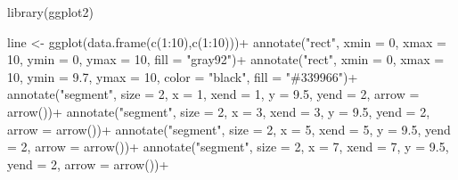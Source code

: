 \documentclass[
  letterpaper,
]{book}
\newenvironment{Shaded}{\begin{snugshade}}{\end{snugshade}}
\newcommand{\AttributeTok}[1]{\textcolor[rgb]{0.40,0.45,0.13}{#1}}
\newcommand{\DecValTok}[1]{\textcolor[rgb]{0.68,0.00,0.00}{#1}}
\newcommand{\FloatTok}[1]{\textcolor[rgb]{0.68,0.00,0.00}{#1}}
\newcommand{\FunctionTok}[1]{\textcolor[rgb]{0.28,0.35,0.67}{#1}}
\newcommand{\NormalTok}[1]{\textcolor[rgb]{0.00,0.23,0.31}{#1}}
\newcommand{\OtherTok}[1]{\textcolor[rgb]{0.00,0.23,0.31}{#1}}
\newcommand{\SpecialCharTok}[1]{\textcolor[rgb]{0.37,0.37,0.37}{#1}}
\newcommand{\StringTok}[1]{\textcolor[rgb]{0.13,0.47,0.30}{#1}}
\begin{document}
\begin{Shaded}
\begin{Highlighting}[]
\FunctionTok{library}\NormalTok{(ggplot2)}

\NormalTok{line }\OtherTok{\textless{}{-}} \FunctionTok{ggplot}\NormalTok{(}\FunctionTok{data.frame}\NormalTok{(}\FunctionTok{c}\NormalTok{(}\DecValTok{1}\SpecialCharTok{:}\DecValTok{10}\NormalTok{),}\FunctionTok{c}\NormalTok{(}\DecValTok{1}\SpecialCharTok{:}\DecValTok{10}\NormalTok{)))}\SpecialCharTok{+}
  \FunctionTok{annotate}\NormalTok{(}\StringTok{"rect"}\NormalTok{, }\AttributeTok{xmin =} \DecValTok{0}\NormalTok{, }\AttributeTok{xmax =} \DecValTok{10}\NormalTok{, }\AttributeTok{ymin =} \DecValTok{0}\NormalTok{, }\AttributeTok{ymax =} \DecValTok{10}\NormalTok{, }\AttributeTok{fill =} \StringTok{"gray92"}\NormalTok{)}\SpecialCharTok{+}
  \FunctionTok{annotate}\NormalTok{(}\StringTok{"rect"}\NormalTok{, }\AttributeTok{xmin =} \DecValTok{0}\NormalTok{, }\AttributeTok{xmax =} \DecValTok{10}\NormalTok{, }\AttributeTok{ymin =} \FloatTok{9.7}\NormalTok{, }\AttributeTok{ymax =} \DecValTok{10}\NormalTok{, }\AttributeTok{color =} \StringTok{"black"}\NormalTok{, }\AttributeTok{fill =} \StringTok{"\#339966"}\NormalTok{)}\SpecialCharTok{+}
  \FunctionTok{annotate}\NormalTok{(}\StringTok{"segment"}\NormalTok{, }\AttributeTok{size =} \DecValTok{2}\NormalTok{, }\AttributeTok{x =} \DecValTok{1}\NormalTok{, }\AttributeTok{xend =} \DecValTok{1}\NormalTok{, }\AttributeTok{y =} \FloatTok{9.5}\NormalTok{, }\AttributeTok{yend =} \DecValTok{2}\NormalTok{, }\AttributeTok{arrow =} \FunctionTok{arrow}\NormalTok{())}\SpecialCharTok{+}
  \FunctionTok{annotate}\NormalTok{(}\StringTok{"segment"}\NormalTok{, }\AttributeTok{size =} \DecValTok{2}\NormalTok{, }\AttributeTok{x =} \DecValTok{3}\NormalTok{, }\AttributeTok{xend =} \DecValTok{3}\NormalTok{, }\AttributeTok{y =} \FloatTok{9.5}\NormalTok{, }\AttributeTok{yend =} \DecValTok{2}\NormalTok{, }\AttributeTok{arrow =} \FunctionTok{arrow}\NormalTok{())}\SpecialCharTok{+}
  \FunctionTok{annotate}\NormalTok{(}\StringTok{"segment"}\NormalTok{, }\AttributeTok{size =} \DecValTok{2}\NormalTok{, }\AttributeTok{x =} \DecValTok{5}\NormalTok{, }\AttributeTok{xend =} \DecValTok{5}\NormalTok{, }\AttributeTok{y =} \FloatTok{9.5}\NormalTok{, }\AttributeTok{yend =} \DecValTok{2}\NormalTok{, }\AttributeTok{arrow =} \FunctionTok{arrow}\NormalTok{())}\SpecialCharTok{+}
  \FunctionTok{annotate}\NormalTok{(}\StringTok{"segment"}\NormalTok{, }\AttributeTok{size =} \DecValTok{2}\NormalTok{, }\AttributeTok{x =} \DecValTok{7}\NormalTok{, }\AttributeTok{xend =} \DecValTok{7}\NormalTok{, }\AttributeTok{y =} \FloatTok{9.5}\NormalTok{, }\AttributeTok{yend =} \DecValTok{2}\NormalTok{, }\AttributeTok{arrow =} \FunctionTok{arrow}\NormalTok{())}\SpecialCharTok{+}

\end{Highlighting}
\end{Shaded}
\end{document}
